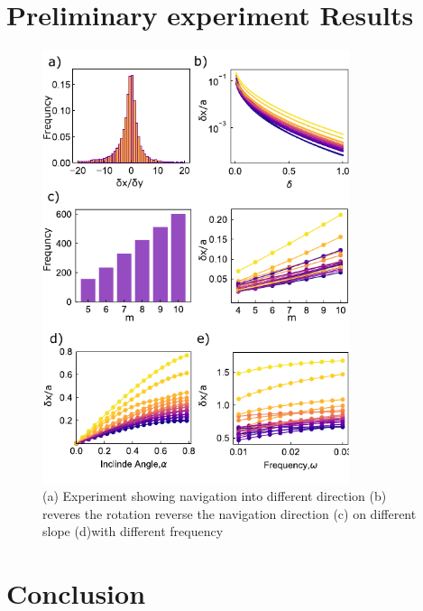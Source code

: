  \section{Preliminary experiment Results}
 \begin{figure}[p]
\centering
\includegraphics[width=9cm]{figures/5_5.pdf}
\caption{ (a) Experiment showing navigation into different direction (b) reveres the rotation reverse the navigation direction (c) on different slope (d)with different frequency  }
\label{fig:1}
\end{figure}
  \section{Conclusion}

